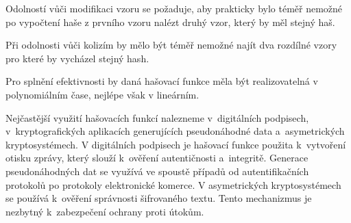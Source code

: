 Odolností vůči modifikaci vzoru se požaduje, aby prakticky bylo téměř nemožné po %
vypočtení haše z prvního vzoru nalézt druhý vzor, který by měl stejný haš.

Při odolnosti vůči kolizím by mělo být téměř nemožné najít dva rozdílné vzory pro které by vycházel stejný hash.\cite{Burda9788021446120ISBN} %

Pro splnění efektivnosti by daná hašovací funkce měla být realizovatelná v polynomiálním čase, nejlépe však v lineárním.\cite{Mao0130669431ISBN} %

Nejčastější využití hašovacích funkcí nalezneme v~digitálních podpisech, v~kryptografických aplikacích generujících pseudonáhodné data a~asymetrických kryptosystémech. V digitálních podpisech je hašovací funkce použita k~vytvoření otisku zprávy, který slouží k~ověření autentičnosti a~integritě. Generace pseudonáhodných dat se využívá ve spoustě případů od autentifikačních protokolů po protokoly elektronické komerce. V asymetrických kryptosystémech se používá k~ověření správnosti šifrovaného textu. Tento mechanizmus je nezbytný k~zabezpečení ochrany proti útokům.\cite{Mao0130669431ISBN}%
